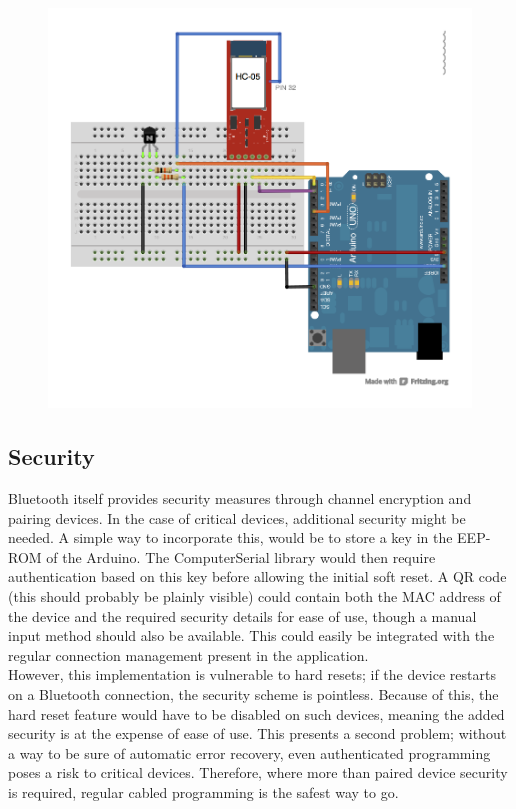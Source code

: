 		\begin{figure}[H]
		\centering
		\label{fig:hardReset}
		\includegraphics[scale=0.8]{images/wiring_hardReset.png}
		\end{figure}
	
    \subsection{Security}
	Bluetooth itself provides security measures through channel encryption and pairing devices. In the case of
    critical devices, additional security might be needed. A simple way to incorporate this, would be to store a
    key in the EEP-ROM of the Arduino. The ComputerSerial library would then require authentication based on this
    key before allowing the initial soft reset. A QR code (this should probably be plainly visible) could contain
    both the MAC address of the device and the required security details for ease of use, though a manual input
    method should also be available. This could easily be integrated with the regular connection management present
    in the application.\\
    
    However, this implementation is vulnerable to hard resets; if the device restarts on a Bluetooth connection, the
    security scheme is pointless. Because of this, the hard reset feature would have to be disabled on such devices,
    meaning the added security is at the expense of ease of use. This presents a second problem; without a way to be
    sure of automatic error recovery, even authenticated programming poses a risk to critical devices.
    Therefore, where more than paired device security is required, regular cabled programming is the safest way to go.
    
